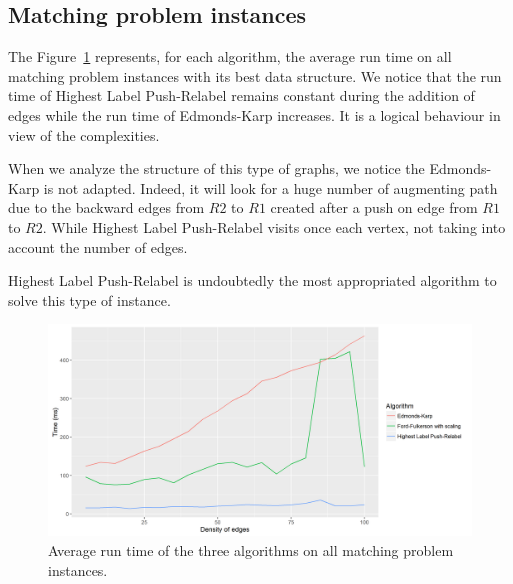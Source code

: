 \subsection{Matching problem instances}
The Figure~\ref{fig:meanmatchingproblem} represents, for each algorithm, the average run time on all matching problem instances with its best data structure. We notice that the run time of Highest Label Push-Relabel remains constant during the addition of edges while the run time of Edmonds-Karp increases. It is a logical behaviour in view of the complexities.

When we analyze the structure of this type of graphs, we notice the Edmonds-Karp is not adapted. Indeed, it will look for a huge number of augmenting path due to the backward edges from $R2$ to $R1$ created after a push on edge from $R1$ to $R2$. While Highest Label Push-Relabel visits once each vertex, not taking into account the number of edges.

Highest Label Push-Relabel is undoubtedly the most appropriated algorithm to solve this type of instance. 

\begin{figure}[H]
\begin{center}
\includegraphics[scale=0.5]{images/meanmatching.png}
\caption{Average run time of the three algorithms on all matching problem instances.}
\label{fig:meanmatchingproblem}
\end{center}
\end{figure}
